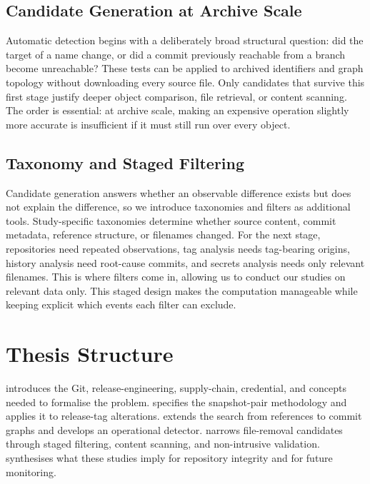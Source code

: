\subsection{Candidate Generation at Archive Scale}
\label{subsec:intro-contrib-empirical}

Automatic detection begins with a deliberately broad structural question: did the target of a name change, or did a commit previously reachable from a branch become unreachable?
These tests can be applied to archived identifiers and graph topology without downloading every source file.
Only candidates that survive this first stage justify deeper object comparison, file retrieval, or content scanning.
The order is essential: at archive scale, making an expensive operation slightly more accurate is insufficient if it must still run over every object.

\subsection{Taxonomy and Staged Filtering}
\label{subsec:intro-contrib-methodological}

Candidate generation answers whether an observable difference exists but does not explain the difference, so we introduce taxonomies and filters as additional tools.
Study-specific taxonomies determine whether source content, commit metadata, reference structure, or filenames changed.
For the next stage, repositories need repeated observations, tag analysis needs tag-bearing origins, history analysis need root-cause commits, and secrets analysis needs only relevant filenames.
This is where filters come in, allowing us to conduct our studies on relevant data only.
This staged design makes the computation manageable while keeping explicit which events each filter can exclude.

\section{Thesis Structure}
\label{sec:intro-structure}

 introduces the Git, release-engineering, supply-chain, credential, and \SWH concepts needed to formalise the problem.
 specifies the snapshot-pair methodology and applies it to release-tag alterations.
 extends the search from references to commit graphs and develops an operational detector.
 narrows file-removal candidates through staged filtering, content scanning, and non-intrusive validation.
 synthesises what these studies imply for repository integrity and for future monitoring.

